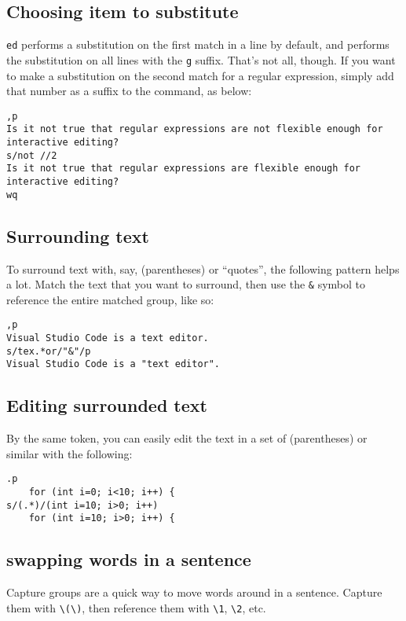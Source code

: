 \documentclass[12pt]{article}
\begin{document}
\subsection{Choosing item to substitute}

\lstinline{ed} performs a substitution on the first match in a line by default, and
performs the substitution on all lines with the \lstinline{g} suffix. That's not all,
though. If you want to make a substitution on the second match for a regular expression,
simply add that number as a suffix to the command, as below:

\begin{lstlisting}
,p
Is it not true that regular expressions are not flexible enough for interactive editing?
s/not //2
Is it not true that regular expressions are flexible enough for interactive editing?
wq
\end{lstlisting}

\subsection{Surrounding text}

To surround text with, say, (parentheses) or ``quotes'', the following pattern helps a lot.
Match the text that you want to surround, then use the \lstinline{&} symbol to reference
the entire matched group, like so:

\begin{lstlisting}
,p
Visual Studio Code is a text editor.
s/tex.*or/"&"/p
Visual Studio Code is a "text editor".
\end{lstlisting}

\subsection{Editing surrounded text}

By the same token, you can easily edit the text in a set of (parentheses) or similar with the following:

\begin{lstlisting}
.p
    for (int i=0; i<10; i++) {
s/(.*)/(int i=10; i>0; i++)
    for (int i=10; i>0; i++) {
\end{lstlisting}

\subsection{swapping words in a sentence}

Capture groups are a quick way to move words around in a sentence. Capture them with \lstinline{\(\)}, then
reference them with \lstinline{\1}, \lstinline{\2}, etc.
\end{document}
